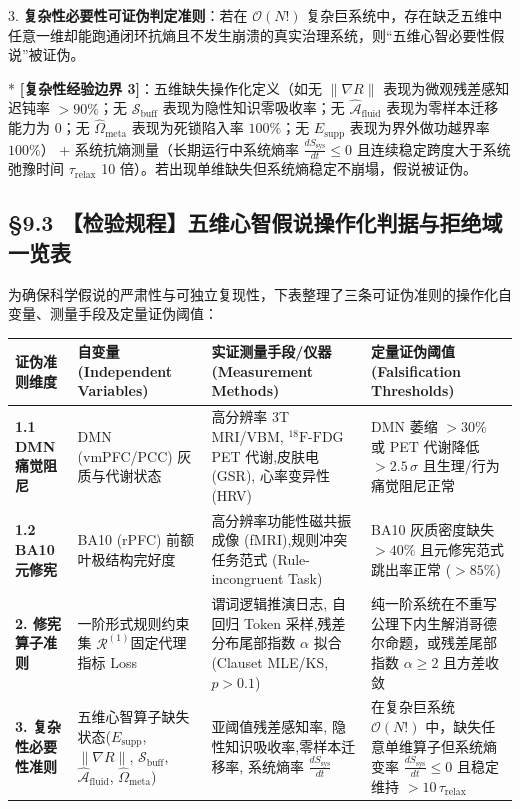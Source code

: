 \documentclass[11pt,a4paper,oneside]{ctexart}
\begin{document}
\begin{cautionbox}
3. \textbf{复杂性必要性可证伪判定准则}：若在 $\mathcal{O}(N!)$ 复杂巨系统中，存在缺乏五维中任意一维却能跑通闭环抗熵且不发生崩溃的真实治理系统，则“五维心智必要性假说”被证伪。

* \textbf{[复杂性经验边界 3]}：五维缺失操作化定义（如无 $\|\nabla R\|$ 表现为微观残差感知迟钝率 $>90\%$；无 $\mathcal{S}_{\text{buff}}$ 表现为隐性知识零吸收率；无 $\hat{\mathcal{A}}_{\text{fluid}}$ 表现为零样本迁移能力为 0；无 $\hat{\Omega}_{\text{meta}}$ 表现为死锁陷入率 $100\%$；无 $E_{\text{supp}}$ 表现为界外做功越界率 $100\%$） + 系统抗熵测量（长期运行中系统熵率 $\frac{dS_{\text{sys}}}{dt} \le 0$ 且连续稳定跨度大于系统弛豫时间 $\tau_{\text{relax}}$ 10 倍）。若出现单维缺失但系统熵稳定不崩塌，假说被证伪。
\end{cautionbox}

\subsection{§9.3 【检验规程】五维心智假说操作化判据与拒绝域一览表}

为确保科学假说的严肃性与可独立复现性，下表整理了三条可证伪准则的操作化自变量、测量手段及定量证伪阈值：


\begin{table}[htbp]
\centering
\small
\begin{tabular}{p{2.8cm}p{3.8cm}p{4.2cm}p{4.2cm}}
\toprule
证伪准则维度 & 自变量 (Independent Variables) & 实证测量手段/仪器 (Measurement Methods) & 定量证伪阈值 (Falsification Thresholds) \\
\midrule
\textbf{1.1 DMN 痛觉阻尼} & DMN (vmPFC/PCC) 灰质与代谢状态 & 高分辨率 3T MRI/VBM, $^{18}\text{F-FDG}$ PET 代谢,\newline 皮肤电 (GSR), 心率变异性 (HRV) & DMN 萎缩 $>30\%$ 或 PET 代谢降低 $>2.5\,\sigma$ 且生理/行为痛觉阻尼正常 \\
\textbf{1.2 BA10 元修宪} & BA10 (rPFC) 前额叶极结构完好度 & 高分辨率功能性磁共振成像 (fMRI),\newline 规则冲突任务范式 (Rule-incongruent Task) & BA10 灰质密度缺失 $>40\%$ 且元修宪范式跳出率正常 ($>85\%$) \\
\textbf{2. 修宪算子准则} & 一阶形式规则约束集 $\mathcal{R}^{(1)}$\newline 固定代理指标 Loss & 谓词逻辑推演日志, 自回归 Token 采样,\newline 残差分布尾部指数 $\alpha$ 拟合 (Clauset MLE/KS, $p>0.1$) & 纯一阶系统在不重写公理下内生解消哥德尔命题，或残差尾部指数 $\alpha \ge 2$ 且方差收敛 \\
\textbf{3. 复杂性必要性准则} & 五维心智算子缺失状态\newline ($E_{\text{supp}}$, $\|\nabla R\|$, $\mathcal{S}_{\text{buff}}$, $\hat{\mathcal{A}}_{\text{fluid}}$, $\hat{\Omega}_{\text{meta}}$) & 亚阈值残差感知率, 隐性知识吸收率,\newline 零样本迁移率, 系统熵率 $\frac{dS_{\text{sys}}}{dt}$ & 在复杂巨系统 $\mathcal{O}(N!)$ 中，缺失任意单维算子但系统熵变率 $\frac{dS_{\text{sys}}}{dt} \le 0$ 且稳定维持 $>10\,\tau_{\text{relax}}$ \\
\bottomrule
\end{tabular}
\end{table}
\end{document}
